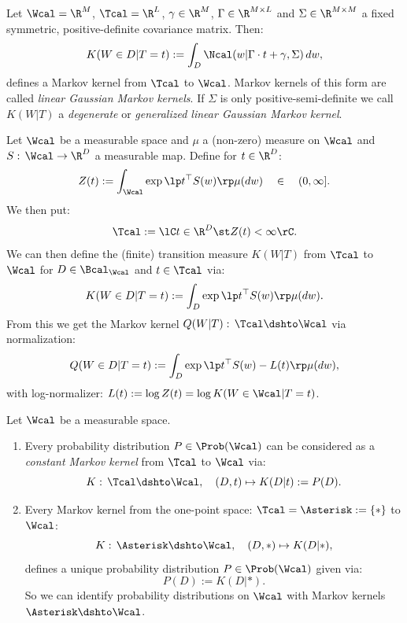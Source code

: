 \begin{Eg}
    Let $\Wcal = \R^M$, $\Tcal = \R^L$, $\gamma \in \R^M$, $\Gamma \in \R^{M \times L}$ and $\Sigma \in \R^{M \times M}$ a fixed symmetric, positive-definite covariance matrix. Then:
    \[ K(W \in D|T=t) := \int_D \Ncal(w|\Gamma \cdot t + \gamma,\Sigma) \, dw,  \]
    defines a Markov kernel from $\Tcal$ to $\Wcal$. Markov kernels of this form are called \emph{linear Gaussian Markov kernels}. If $\Sigma$ is only positive-semi-definite we call $K(W|T)$ a \emph{degenerate} or
    \emph{generalized linear Gaussian Markov kernel}.
\end{Eg}

\begin{Eg}
    Let $\Wcal$ be a measurable space and $\mu$ a (non-zero) measure on $\Wcal$ and $S:\,\Wcal \to \R^D$ a measurable map.
    Define for $t \in \R^D$:
    \[ Z(t) := \int_\Wcal \exp\lp t^\top S(w) \rp \mu(dw) \quad\in \quad (0,\infty].\]
    We then put:
    \[ \Tcal := \lC t\in \R^D \st Z(t) < \infty \rC.\]
    We can then define the (finite) transition measure $K(W|T)$ from $\Tcal$ to $\Wcal$ 
    for $D \in \Bcal_\Wcal$ and $t \in \Tcal$ via:
    \[ K(W \in D|T=t) := \int_D \exp\lp t^\top S(w) \rp \mu(dw).  \]
    From this we get the Markov kernel $Q(W|T):\, \Tcal \dshto \Wcal$ via normalization:
    \[ Q(W \in D|T=t) := \int_D \exp\lp t^\top S(w) - L(t) \rp \mu(dw),  \]
    with log-normalizer: $L(t):=\log Z(t) = \log K(W \in \Wcal|T=t)$.
\end{Eg}

\begin{Rem} Let $\Wcal$ be a measurable space.
    \begin{enumerate}
        \item Every probability distribution $P \in \Prob(\Wcal)$ can be considered as a \emph{constant Markov kernel} from $\Tcal$ to $\Wcal$ via:
            \[  K:\, \Tcal \dshto \Wcal,\quad (D,t) \mapsto K(D|t):=P(D).   \]
        \item Every Markov kernel from the  one-point space: $\Tcal=\Asterisk:=\{\ast\}$ to $\Wcal$:
            \[ K:\, \Asterisk \dshto \Wcal,\quad (D,\ast) \mapsto K(D|\ast),\]
            defines a unique probability distribution $P \in \Prob(\Wcal)$ given via:
            \[ P(D):=K(D|\ast).\]
            So we can identify probability distributions on $\Wcal$ with Markov kernels $\Asterisk \dshto \Wcal$.
    \end{enumerate}
\end{Rem}

